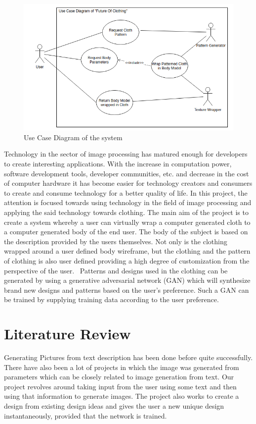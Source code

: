 \documentclass{article}
\begin{document}
\begin{figure}[h]
    \includegraphics[scale=0.6]{images/softwareDiagrams/FinalSystemUseCase.png}
    \centering
    \caption{Use Case Diagram of the system}
    
\end{figure}
Technology in the sector of image processing has matured enough for developers to create interesting applications. With the increase in computation power, software development tools, developer communities, etc. and decrease in the cost of computer hardware it has become easier for technology creators and consumers to create and consume technology for a better quality of life.
In this project, the attention is focused towards using technology in the field of image processing and applying the said technology towards clothing. The main aim of the project is to create a system whereby a user can virtually wrap a computer generated cloth to a computer generated body of the end user. The body of the subject is based on the description provided by the users themselves. Not only is the clothing wrapped around a user defined body wireframe, but the clothing and the pattern of clothing is also user defined providing a high degree of customization from the perspective of the user. 
Patterns and designs used in the clothing can be generated by using a generative adversarial network (GAN) which will synthesize brand new designs and patterns based on the user’s preference. Such a GAN can be trained by supplying training data according to the user preference.
\newpage
\section{Literature Review}

Generating Pictures from text description has been done before quite successfully. There have also been a lot of projects in which the image was generated from parameters which can be closely related to image generation from text. Our project revolves around taking input from the user using some text and then using that information to generate images. The project also works to create a design from existing design ideas and gives the user a new unique design instantaneously, provided that the network is trained.
\end{document}
